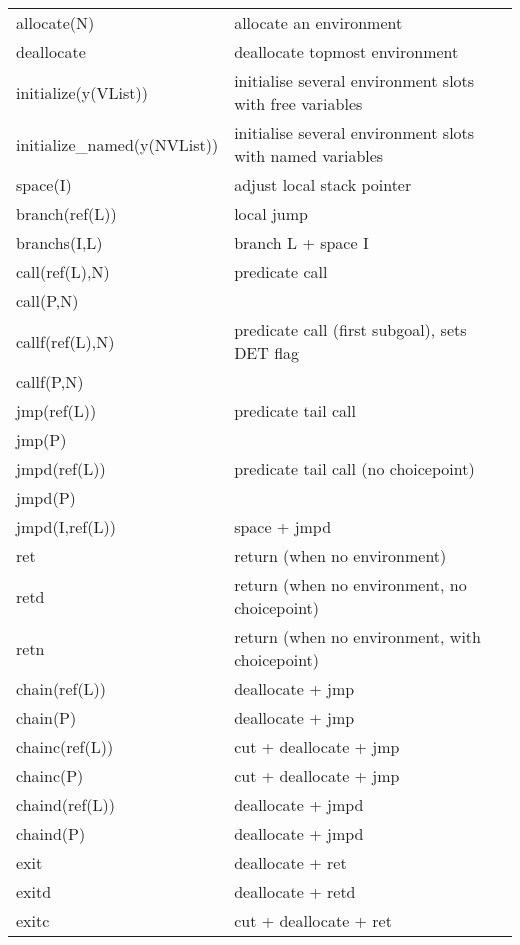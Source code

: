 \begin{tabular}{|l|p{10cm}|}
\hline
allocate(N)             & allocate an environment                 \\
deallocate              & deallocate topmost environment                  \\
initialize(y(VList))    & initialise several environment slots with free variables                        \\
initialize_named(y(NVList))     & initialise several environment slots with named variables                               \\
\hline
space(I)                & adjust local stack pointer              \\
branch(ref(L))          & local jump              \\
branchs(I,L)            & branch L + space I              \\
\hline
call(ref(L),N)          & predicate call                  \\
call(P,N)               &                 \\
callf(ref(L),N)         & predicate call (first subgoal), sets DET flag           \\
callf(P,N)              &                 \\
jmp(ref(L))             & predicate tail call             \\
jmp(P)                  &         \\
jmpd(ref(L))            & predicate tail call (no choicepoint)            \\
jmpd(P)                 &         \\
jmpd(I,ref(L))          & space + jmpd            \\
ret                     & return (when no environment)    \\
retd                    & return (when no environment, no choicepoint)    \\
retn                    & return (when no environment, with choicepoint)          \\
\hline
chain(ref(L))           & deallocate + jmp                \\
chain(P)                & deallocate + jmp                \\
chainc(ref(L))          & cut + deallocate + jmp                  \\
chainc(P)               & cut + deallocate + jmp                  \\
chaind(ref(L))          & deallocate + jmpd               \\
chaind(P)               & deallocate + jmpd               \\
exit                    & deallocate + ret        \\
exitd                   & deallocate + retd       \\
exitc                   & cut + deallocate + ret          \\
\hline
\end{tabular}

